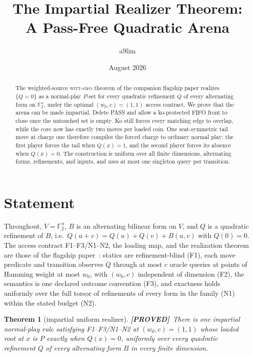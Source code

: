 \documentclass[11pt]{article}
\title{The Impartial Realizer Theorem:\\
A Pass-Free Quadratic Arena}
\author{a9lim}
\date{August 2026}
\newtheorem{theorem}{Theorem}
\theoremstyle{definition}
\theoremstyle{remark}
\newcommand{\F}{\mathbb{F}}
\newcommand{\taglabel}[1]{\textnormal{\textbf{[#1]}}}
\newcommand{\PROVED}{\taglabel{PROVED}}
\begin{document}
\maketitle

\begin{abstract}
The weighted-source \textsc{witt-fifo} theorem of the companion flagship
paper realizes $\{Q=0\}$ as a normal-play $P$-set for every quadratic
refinement $Q$ of every alternating form on $\F_2^n$, under the optimal
$(w_0,c)=(1,1)$ access contract.  We prove that the arena can be made
impartial.  Delete PASS and allow a ko-protected FIFO front to close once
the untouched set is empty.  Ko still forces every matching edge to overlap,
while the core now has exactly two moves per loaded coin.  One seat-symmetric
tail move at charge one therefore compiles the forced charge to ordinary
normal play: the first player forces the tail when $Q(x)=1$, and the second
player forces its absence when $Q(x)=0$.  The construction is uniform over
all finite dimensions, alternating forms, refinements, and inputs, and uses
at most one singleton query per transition.
\end{abstract}

\section{Statement}

Throughout, $V=\F_2^n$, $B$ is an alternating bilinear form on $V$, and
$Q$ is a quadratic refinement of $B$, i.e.\ $Q(u+v)=Q(u)+Q(v)+B(u,v)$
with $Q(0)=0$.  The access contract F1--F3/N1--N2, the loading map, and
the realization theorem are those of the flagship
paper~\cite{goldarf}: statics are refinement-blind (F1), each move
predicate and transition observes $Q$ through at most $c$ oracle queries
at points of Hamming weight at most $w_0$, with $(w_0,c)$ independent of
dimension (F2), the semantics is one declared outcome convention (F3),
and exactness holds uniformly over the full torsor of refinements of
every form in the family (N1) within the stated budget (N2).

\begin{theorem}[impartial uniform realizer]\label{thm:impartial}
\PROVED\ There is one impartial normal-play rule satisfying
F1--F3/N1--N2 at $(w_0,c)=(1,1)$ whose loaded root at $x$ is $P$ exactly
when $Q(x)=0$, uniformly over every quadratic refinement $Q$ of every
alternating form $B$ in every finite dimension.
\end{theorem}
\end{document}
